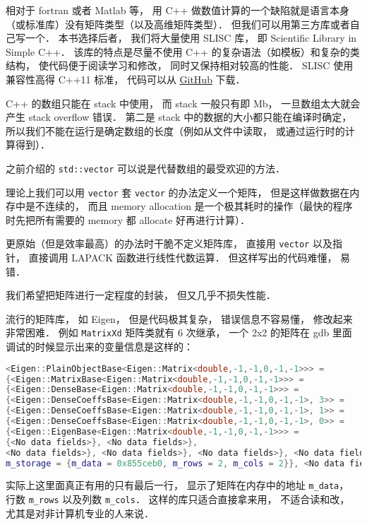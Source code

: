 
\begin{issues}
\issueDraft
\end{issues}

相对于 fortran 或者 Matlab 等， 用 C++ 做数值计算的一个缺陷就是语言本身（或标准库）没有矩阵类型（以及高维矩阵类型）． 但我们可以用第三方库或者自己写一个． 本书选择后者， 我们将大量使用 SLISC 库， 即 Scientific Library in Simple C++． 该库的特点是尽量不使用 C++ 的复杂语法（如模板）和复杂的类结构， 使代码便于阅读学习和修改， 同时又保持相对较高的性能． SLISC 使用兼容性高得 C++11 标准， 代码可以从 \href{https://github.com/MacroUniverse/SLISC0}{GitHub} 下载．

C++ 的数组只能在 stack 中使用， 而 stack 一般只有即 Mb， 一旦数组太大就会产生 stack overflow 错误． 第二是 stack 中的数据的大小都只能在编译时确定， 所以我们不能在运行是确定数组的长度（例如从文件中读取， 或通过运行时的计算得到）．

之前介绍的 \verb|std::vector| 可以说是代替数组的最受欢迎的方法．

理论上我们可以用 \verb|vector| 套 \verb|vector| 的办法定义一个矩阵， 但是这样做数据在内存中是不连续的， 而且 memory allocation 是一个极其耗时的操作（最快的程序时先把所有需要的 memory 都 allocate 好再进行计算）．

更原始（但是效率最高）的办法时干脆不定义矩阵库， 直接用 \verb|vector| 以及指针， 直接调用 LAPACK 函数进行线性代数运算． 但这样写出的代码难懂， 易错．

我们希望把矩阵进行一定程度的封装， 但又几乎不损失性能．

流行的矩阵库， 如 Eigen， 但是代码极其复杂， 错误信息不容易懂， 修改起来非常困难． 例如 \verb|MatrixXd| 矩阵类就有 6 次继承， 一个 2x2 的矩阵在 gdb 里面调试的时候显示出来的变量信息是这样的：
\begin{lstlisting}[language=cpp]
<Eigen::PlainObjectBase<Eigen::Matrix<double,-1,-1,0,-1,-1>>> = 
{<Eigen::MatrixBase<Eigen::Matrix<double,-1,-1,0,-1,-1>>> = 
{<Eigen::DenseBase<Eigen::Matrix<double,-1,-1,0,-1,-1>>> = 
{<Eigen::DenseCoeffsBase<Eigen::Matrix<double,-1,-1,0,-1,-1>, 3>> = 
{<Eigen::DenseCoeffsBase<Eigen::Matrix<double,-1,-1,0,-1,-1>, 1>> = 
{<Eigen::DenseCoeffsBase<Eigen::Matrix<double,-1,-1,0,-1,-1>, 0>> = 
{<Eigen::EigenBase<Eigen::Matrix<double,-1,-1,0,-1,-1>>> =
{<No data fields>}, <No data fields>}, 
<No data fields>}, <No data fields>}, <No data fields>}, <No data fields>},
m_storage = {m_data = 0x855ceb0, m_rows = 2, m_cols = 2}}, <No data fields>
\end{lstlisting}
实际上这里面真正有用的只有最后一行， 显示了矩阵在内存中的地址 \verb|m_data|， 行数 \verb|m_rows| 以及列数 \verb|m_cols|． 这样的库只适合直接拿来用， 不适合读和改， 尤其是对非计算机专业的人来说．

